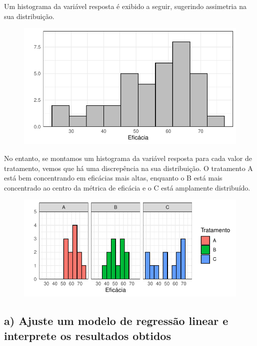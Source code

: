 \documentclass[
  letterpaper,
  DIV=11,
  numbers=noendperiod]{scrartcl}
\begin{document}
Um histograma da variável resposta é exibido a seguir, sugerindo
assimetria na sua distribuição.

\begin{figure}

{\centering \includegraphics{lista2_files/figure-pdf/histograma-q2-1.pdf}

}

\end{figure}

No entanto, se montamos um histograma da variável resposta para cada
valor de tratamento, vemos que há uma discrepência na sua distribuição.
O tratamento A está bem concentrando em eficácias mais altas, enquanto o
B está mais concentrado ao centro da métrica de eficácia e o C está
amplamente distribuído.

\begin{figure}

{\centering \includegraphics{lista2_files/figure-pdf/histograma-q2-facet-1.pdf}

}

\end{figure}

\hypertarget{a-ajuste-um-modelo-de-regressuxe3o-linear-e-interprete-os-resultados-obtidos}{%
\subsection{a) Ajuste um modelo de regressão linear e interprete os
resultados
obtidos}\label{a-ajuste-um-modelo-de-regressuxe3o-linear-e-interprete-os-resultados-obtidos}}
\end{document}
